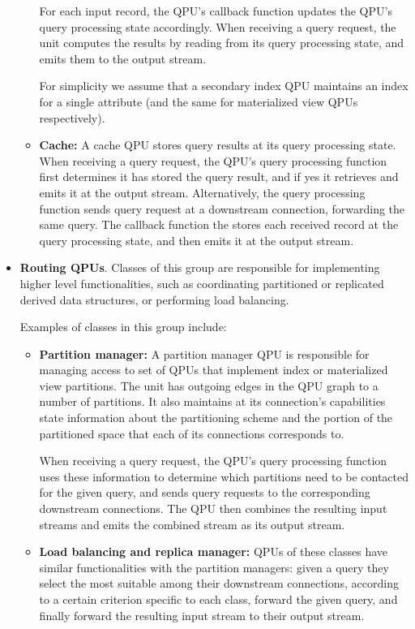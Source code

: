 \begin{itemize}
\begin{itemize}
    For each input record, the QPU's callback function updates the QPU's query processing state accordingly.
    When receiving a query request, the unit computes the results by reading from its query processing state,
    and emits them to the output stream.

    For simplicity we assume that a secondary index QPU maintains an index for a single attribute
    (and the same for materialized view QPUs respectively).

    
    \item \textbf{Cache:}
    A cache QPU stores query results at its query processing state.
    When receiving a query request, the QPU's query processing function first determines it has stored the query result,
    and if yes it retrieves and emits it at the output stream.
    Alternatively, the query processing function sends query request at a downstream connection, forwarding the same query.
    The callback function the stores each received record at the query processing state, and then emits it at the output
    stream.
    \end{itemize}

  \item \textbf{Routing QPUs}.
  Classes of this group are responsible for implementing higher level functionalities, such as coordinating partitioned or
  replicated derived data structures, or performing load balancing.

  Examples of classes in this group include:
  \begin{itemize}
    \item \textbf{Partition manager:}
    A partition manager QPU is responsible for managing access to set of QPUs that implement index or materialized view
    partitions.
    The unit has outgoing edges in the QPU graph to a number of partitions.
    It also maintains at its connection's capabilities state information about the partitioning scheme and the portion of
    the partitioned space that each of its connections corresponds to.

    When receiving a query request, the QPU's query processing function uses these information to determine which
    partitions need to be contacted for the given query,
    and sends query requests to the corresponding downstream connections.
    The QPU then combines the resulting input streams and emits the combined stream as its output stream.

    \item \textbf{Load balancing and replica manager:}
    QPUs of these classes have similar functionalities with the partition managers:
    given a query they select the most suitable among their downstream connections, according to a certain criterion specific
    to each class, forward the given query, and finally forward the resulting input stream to their output stream.


\end{itemize}
\end{itemize}
